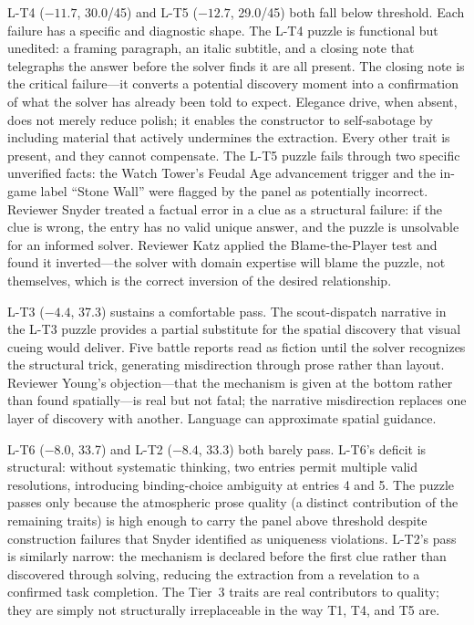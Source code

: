 L-T4 ($-11.7$, 30.0/45) and L-T5 ($-12.7$, 29.0/45) both fall below threshold. Each failure has a specific and diagnostic shape. The L-T4 puzzle is functional but unedited: a framing paragraph, an italic subtitle, and a closing note that telegraphs the answer before the solver finds it are all present. The closing note is the critical failure---it converts a potential discovery moment into a confirmation of what the solver has already been told to expect. Elegance drive, when absent, does not merely reduce polish; it enables the constructor to self-sabotage by including material that actively undermines the extraction. Every other trait is present, and they cannot compensate. The L-T5 puzzle fails through two specific unverified facts: the Watch Tower's Feudal Age advancement trigger and the in-game label ``Stone Wall'' were flagged by the panel as potentially incorrect. Reviewer Snyder treated a factual error in a clue as a structural failure: if the clue is wrong, the entry has no valid unique answer, and the puzzle is unsolvable for an informed solver. Reviewer Katz applied the Blame-the-Player test and found it inverted---the solver with domain expertise will blame the puzzle, not themselves, which is the correct inversion of the desired relationship.

L-T3 ($-4.4$, 37.3) sustains a comfortable pass. The scout-dispatch narrative in the L-T3 puzzle provides a partial substitute for the spatial discovery that visual cueing would deliver. Five battle reports read as fiction until the solver recognizes the structural trick, generating misdirection through prose rather than layout. Reviewer Young's objection---that the mechanism is given at the bottom rather than found spatially---is real but not fatal; the narrative misdirection replaces one layer of discovery with another. Language can approximate spatial guidance.

L-T6 ($-8.0$, 33.7) and L-T2 ($-8.4$, 33.3) both barely pass. L-T6's deficit is structural: without systematic thinking, two entries permit multiple valid resolutions, introducing binding-choice ambiguity at entries 4 and 5. The puzzle passes only because the atmospheric prose quality (a distinct contribution of the remaining traits) is high enough to carry the panel above threshold despite construction failures that Snyder identified as uniqueness violations. L-T2's pass is similarly narrow: the mechanism is declared before the first clue rather than discovered through solving, reducing the extraction from a revelation to a confirmed task completion. The Tier~3 traits are real contributors to quality; they are simply not structurally irreplaceable in the way T1, T4, and T5 are.

